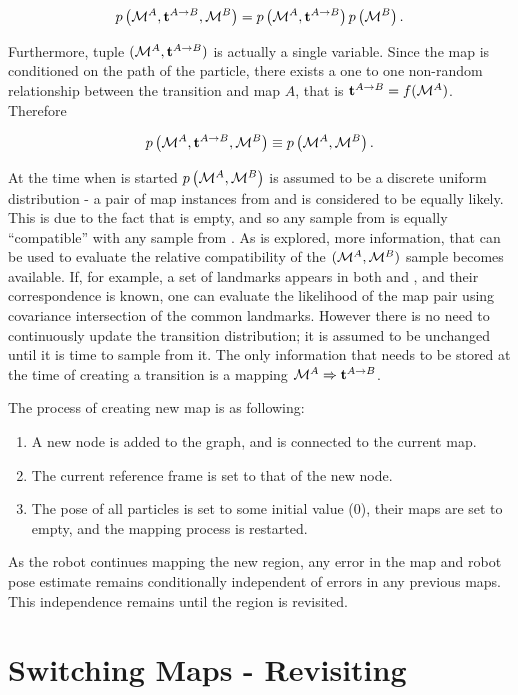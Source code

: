 $$
 \prob{\mapA,\tr{}{A}{B},\mapB} = \prob{\mapA,\tr{}{A}{B}}\prob{\mapB}.
$$

Furthermore, tuple $(\mapA, \tr{}{A}{B})$ is actually a single variable.
Since the map is conditioned on the path of the particle, there exists a
one to one non-random relationship between the transition and map $A$,
that is $\tr{}{A}{B} = f(\mapA)$. Therefore

$$
\prob{\mapA,\tr{}{A}{B},\mapB} \equiv \prob{\mapA,\mapB}.
$$

At the time when \mapB is started $\prob{\mapA,\mapB}$ is assumed to
be a discrete uniform distribution - a pair of map instances from
\mapA and \mapB is considered to be equally likely. This is due to the
fact that \mapB is empty, and so any sample from \mapB is equally
``compatible'' with any sample from \mapA. As \mapB is explored, more
information, that can be used to evaluate the relative compatibility
of the $(\mapA,\mapB)$ sample becomes available. If, for example, a
set of landmarks appears in both \mapA and \mapB, and their
correspondence is known, one can evaluate the likelihood of the map
pair using covariance intersection \cite{cov_intersection} of the
common landmarks. However there is no need to continuously update the
transition distribution; it is assumed to be unchanged until it is
time to sample from it. The only information that needs to be stored
at the time of creating a transition is a mapping $\mapA \Rightarrow
\tr{}{A}{B}$.


The process of creating new map is as following:

\begin{enumerate}

\item A new node is added to the graph, and is connected to the
  current map.

\item The current reference frame is set to that of the new node.

\item The pose of all particles is set to some initial value (0),
  their maps are set to empty, and the mapping process is restarted.

\end{enumerate}

As the robot continues mapping the new region, any error in the map
and robot pose estimate remains conditionally independent of errors
in any previous maps. This independence remains until the region is
revisited.


\section{Switching Maps - Revisiting}
\label{sec:revisiting}

